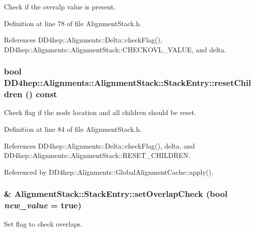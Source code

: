 Check if the overalp value is present. 

Definition at line 78 of file AlignmentStack.h.

References DD4hep::Alignments::Delta::checkFlag(), DD4hep::Alignments::AlignmentStack::CHECKOVL\_\-VALUE, and delta.\hypertarget{struct_d_d4hep_1_1_alignments_1_1_alignment_stack_1_1_stack_entry_a11159bc6f1295a09d09bea74578002e1}{
\subsubsection[{resetChildren}]{\setlength{\rightskip}{0pt plus 5cm}bool DD4hep::Alignments::AlignmentStack::StackEntry::resetChildren () const}}
\label{struct_d_d4hep_1_1_alignments_1_1_alignment_stack_1_1_stack_entry_a11159bc6f1295a09d09bea74578002e1}


Check flag if the node location and all children should be reset. 

Definition at line 84 of file AlignmentStack.h.

References DD4hep::Alignments::Delta::checkFlag(), delta, and DD4hep::Alignments::AlignmentStack::RESET\_\-CHILDREN.

Referenced by DD4hep::Alignments::GlobalAlignmentCache::apply().\hypertarget{struct_d_d4hep_1_1_alignments_1_1_alignment_stack_1_1_stack_entry_aab3b64eec3b308f200667f95d1b60a16}{
\subsubsection[{setOverlapCheck}]{ \& AlignmentStack::StackEntry::setOverlapCheck (bool {\em new\_\-value} = {\ttfamily true})}}
\label{struct_d_d4hep_1_1_alignments_1_1_alignment_stack_1_1_stack_entry_aab3b64eec3b308f200667f95d1b60a16}


Set flag to check overlaps. 

